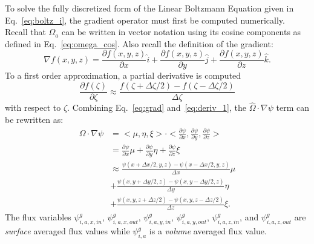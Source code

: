 To solve the fully discretized form of the Linear Boltzmann Equation given in Eq.~\ref{eq:boltz_i}, the gradient operator must first be computed numerically. Recall that $\Omega_a$ can be written in vector notation using its cosine components as defined in Eq.~\ref{eq:omega_cos}. Also recall the definition of the gradient:
\begin{equation} \label{eq:grad}
\nabla f(x, y, z) = \frac{\partial f(x, y, z)}{\partial x} \hat{i} + \frac{\partial f(x, y, z)}{\partial y} \hat{j} + \frac{\partial f(x, y, z)}{\partial z} \hat{k}.
\end{equation}
To a first order approximation, a partial derivative is computed
\begin{equation} \label{eq:deriv_1}
\frac{\partial f(\zeta)}{\partial \zeta} \approx \frac{f(\zeta+\Delta \zeta/2) - f(\zeta - \Delta \zeta/2)}{\Delta \zeta}
\end{equation}
with respect to $\zeta$. Combining Eq.~\ref{eq:grad} and~\ref{eq:deriv_1}, the $\hat{\Omega} \cdot \nabla \psi$ term can be rewritten as:
\begin{equation} \label{eq:spatial_1}
\begin{split}
\Omega \cdot \nabla \psi 
& = <\mu, \eta, \xi> \cdot <\frac{\partial \psi}{\partial x}, \frac{\partial \psi}{\partial y}, \frac{\partial \psi}{\partial z}> \\
& =
\frac{\partial \psi}{\partial x}\mu + \frac{\partial \psi}{\partial y}\eta + \frac{\partial \psi}{\partial z}\xi \\
& \approx 
\frac{\psi(x + \Delta x/2, y, z) - \psi(x - \Delta x/2, y, z)}{\Delta x} \mu \\
&+ 
\frac{\psi(x, y + \Delta y/2, z) - \psi(x, y - \Delta y/2, z)}{\Delta y} \eta \\
&+ 
\frac{\psi(x, y, z + \Delta z/2) - \psi(x, y, z - \Delta z/2)}{\Delta z} \xi.
\end{split}
\end{equation}
The flux variables $\psi_{i,a,x,in}^g$, $\psi_{i,a,x,out}^g$, $\psi_{i,a,y,in}^g$, $\psi_{i,a,y,out}^g$, $\psi_{i,a,z,in}^g$, and $\psi_{i,a,z,out}^g$ are \textit{surface} averaged flux values while $\psi_{i,a}^{g}$ is a \textit{volume} averaged flux value.

